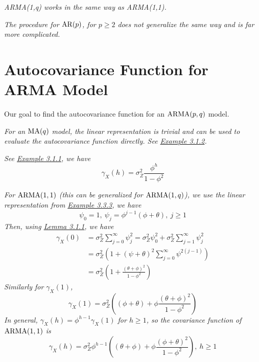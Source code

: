 \begin{example}[ARMA(1,q)]
    \emph{ARMA(1,q) works in the same way as ARMA(1,1).}
\end{example}

\begin{example}[AR(p)]
    \emph{
        The procedure for $\operatorname{AR}(p)$, for $p\geq 2$ does not generalize the same way and is far more complicated. 
    }
\end{example}

\section{Autocovariance Function for ARMA Model}

Our goal to find the autocovariance function for an $\operatorname{ARMA}(p,q)$ model. 

\begin{example}[MA(q)]
    \emph{
        For an $\operatorname{MA}(q)$ model, the linear representation is trivial and can be used to evaluate the autocovariance function directly. See \hyperref[ex:maq_acf]{Example 3.1.2}.
    }
\end{example}

\begin{example}[AR(1)]
    \emph{
        See \hyperref[ex:ar1_acf]{Example 3.1.1}, we have 
        \[\gamma_X(h) = \sigma_Z^2\frac{\phi^h}{1-\phi^2}\]
    }
\end{example}

\begin{example}[ARMA(1,1)]
    \emph{
        For $\operatorname{ARMA}(1,1)$ (this can be generalized for $\operatorname{ARMA}(1,q)$), we use the linear representation from \hyperref[ex:linear_arma11]{Example 3.3.3}, we have 
        \[\psi_0 = 1, \ \psi_j = \phi^{j-1}(\phi + \theta), \ j \geq 1\]
        Then, using \hyperref[lemma:linear_acf]{Lemma 3.1.1}, we have
        \begin{align*}
            \gamma_X(0) &= \sigma_Z^2\sum_{j=0}^\infty \psi_j^2 =\sigma_Z^2\psi_0^2 + \sigma_Z^2 \sum_{j=1}^\infty \psi_j^2\\
            &= \sigma_Z^2 \left(1 + (\psi + \theta)^2 \sum_{j=0}^\infty \psi^{2(j-1)}\right)\\
            &= \sigma_Z^2 \left(1 + \frac{(\theta + \phi)^2}{1-\phi^2}\right)
        \end{align*}
        Similarly for $\gamma_X(1)$, 
        \[\gamma_X(1) = \sigma_Z^2 \left((\phi + \theta) + \phi \frac{(\theta + \phi)^2}{1-\phi^2}\right)\]
        In general, $\gamma_X(h) = \phi^{h-1}\gamma_X(1)$ for $h \geq 1$, so the covariance function of $\operatorname{ARMA}(1,1)$ is
        \[\gamma_X(h) = \sigma_Z^2\phi^{h-1}\left((\theta+\phi) + \phi \frac{(\phi + \theta)^2}{1-\phi^2}\right), \ h \geq 1\]
    }
\end{example}

